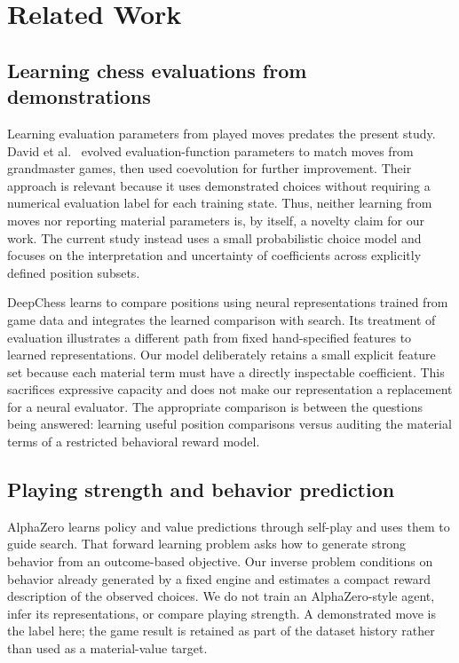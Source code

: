 \section{Related Work}
\subsection{Learning chess evaluations from demonstrations}
Learning evaluation parameters from played moves predates the present study. David et al.\ \cite{david} evolved evaluation-function parameters to match moves from grandmaster games, then used coevolution for further improvement. Their approach is relevant because it uses demonstrated choices without requiring a numerical evaluation label for each training state. Thus, neither learning from moves nor reporting material parameters is, by itself, a novelty claim for our work. The current study instead uses a small probabilistic choice model and focuses on the interpretation and uncertainty of coefficients across explicitly defined position subsets.

DeepChess \cite{deepchess} learns to compare positions using neural representations trained from game data and integrates the learned comparison with search. Its treatment of evaluation illustrates a different path from fixed hand-specified features to learned representations. Our model deliberately retains a small explicit feature set because each material term must have a directly inspectable coefficient. This sacrifices expressive capacity and does not make our representation a replacement for a neural evaluator. The appropriate comparison is between the questions being answered: learning useful position comparisons versus auditing the material terms of a restricted behavioral reward model.

\subsection{Playing strength and behavior prediction}
AlphaZero \cite{alphazero} learns policy and value predictions through self-play and uses them to guide search. That forward learning problem asks how to generate strong behavior from an outcome-based objective. Our inverse problem conditions on behavior already generated by a fixed engine and estimates a compact reward description of the observed choices. We do not train an AlphaZero-style agent, infer its representations, or compare playing strength. A demonstrated move is the label here; the game result is retained as part of the dataset history rather than used as a material-value target.


